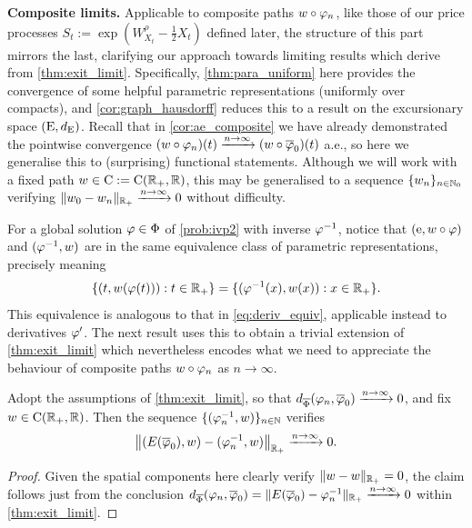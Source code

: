 \vspace{3mm}\textbf{Composite limits.} Applicable to composite paths $w\circ\varphi_n$, like those of our price processes $S_t:=\exp(W^\rho_{X_t}-\frac12 X_t)$ defined later, the structure of this part mirrors the last, clarifying our approach towards limiting results which derive from \autoref{thm:exit_limit}. Specifically, \autoref{thm:para_uniform} here provides the convergence of some helpful parametric representations (uniformly over compacts), and \autoref{cor:graph_hausdorff} reduces this to a result on the excursionary space $(\mathrm{E},d_{\mathrm{E}})$. Recall that in \autoref{cor:ae_composite} we have already demonstrated the pointwise convergence $(w\circ\varphi_n)(t)\xrightarrow{n\to\infty}(w\circ\overline{\varphi}_0)(t)$ a.e., so here we generalise this to (surprising) functional statements. Although we will work with a fixed path $w\in\mathrm{C}:=\mathrm{C}(\mathbb{R}_+,\mathbb{R})$, this may be generalised to a sequence $\{w_n\}_{n\in\mathbb{N}_0}$ verifying $\Vert w_0 - w_n\Vert_{\mathbb{R}_+}\xrightarrow{n\to\infty} 0$ without difficulty.

For a global solution $\varphi\in\Phi$ of \autoref{prob:ivp2} with inverse $\varphi^{-1}$, notice that $(\mathrm{e},w\circ\varphi)$ and $(\varphi^{-1},w)$ are in the same equivalence class of parametric representations, precisely meaning
\begin{equation}\label{eq:para_equiv}
    \{(t,w(\varphi(t))):t\in\mathbb{R}_+\} = \{(\varphi^{-1}(x),w(x)):x\in\mathbb{R}_+\}.
\end{equation}
This equivalence is analogous to that in \autoref{eq:deriv_equiv}, applicable instead to derivatives $\varphi'$. The next result uses this to obtain a trivial extension of \autoref{thm:exit_limit} which nevertheless encodes what we need to appreciate the behaviour of composite paths $w\circ\varphi_n$ as $n\to\infty$.

\begin{corollary}\label{thm:para_uniform}
    Adopt the assumptions of \autoref{thm:exit_limit}, so that $d_{\overline{\Phi}}(\varphi_n,\overline{\varphi}_0)\xrightarrow{n\to\infty}0$, and fix $w\in\mathrm{C}(\mathbb{R}_+,\mathbb{R})$. Then the sequence $\{(\varphi^{-1}_n,w)\}_{n\in\mathbb{N}}$ verifies
    \begin{equation}
         \left\Vert (E(\overline{\varphi}_0),w) - (\varphi^{-1}_n,w)\right\Vert_{\mathbb{R}_+} \xrightarrow{n\to\infty}  0.
    \end{equation}
\end{corollary}
\begin{proof}
    Given the spatial components here clearly verify $\Vert w-w\Vert_{\mathbb{R}_+}=0$, the claim follows just from the conclusion $d_{\overline{\Phi}}(\varphi_n,\overline{\varphi}_0)=\Vert E(\overline{\varphi}_0)-\varphi_n^{-1}\Vert_{\mathbb{R}_+}\xrightarrow{n\to\infty}0$ within \autoref{thm:exit_limit}.
\end{proof}

